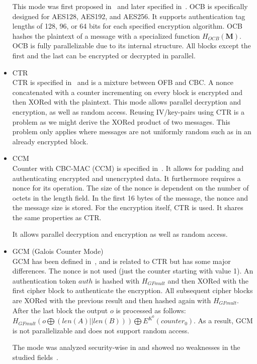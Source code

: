 \begin{itemize}
	This mode was first proposed in~\cite{rogaway2003ocb} and later specified in~\cite{krovetz-ocb-04}. OCB is specifically designed for AES128, AES192, and AES256. It supports authentication tag lengths of 128, 96, or 64 bits for each specified encryption algorithm. OCB hashes the plaintext of a message with a specialized function $H_{OCB}(\mathbf{M})$. OCB is fully parallelizable due to its internal structure. All blocks except the first and the last can be encrypted or decrypted in parallel.
	\item CTR\\
	CTR is specified in~\cite{lipmaa2000ctr} and is a mixture between OFB and CBC. A nonce concatenated with a counter incrementing on every block is encrypted and then XORed with the plaintext. This mode allows parallel decryption and encryption, as well as random access. Reusing IV/key-pairs using CTR is a problem as we might derive the XORed product of two messages. This problem only applies where messages are not uniformly random such as in an already encrypted block.
	\item CCM\\
	Counter with CBC-MAC (CCM) is specified in~\cite{rfc3610}. It allows for padding and authenticating encrypted and unencrypted data. It furthermore requires a nonce for its operation. The size of the nonce is dependent on the number of octets in the length field. In the first 16 bytes of the message, the nonce and the message size is stored. For the encryption itself, CTR is used. It shares the same properties as CTR. 
	
	It allows parallel decryption and encryption as well as random access.
	\item GCM (Galois Counter Mode)\\
	GCM has been defined in~\cite{mcgrew2004galois}, and is related to CTR but has some major differences. The nonce is not used (just the counter starting with value 1). An authentication token $auth$ is hashed with $H_{GFmult}$ and then XORed with the first cipher block to authenticate the encryption. All subsequent cipher blocks are XORed with the previous result and then hashed again with $H_{GFmult}$. After the last block the output $o$ is processed  as follows: $H_{GFmult}(o\bigoplus (len(A)||len(B))) \bigoplus E^{K^0}(counter_0)$. As a result, GCM is not parallelizable and does not support random access.
	
	The mode was analyzed security-wise in \citeyear{mcgrew2004security} and showed no weaknesses in the studied fields~\cite{mcgrew2004security}. 
	

\end{itemize}
